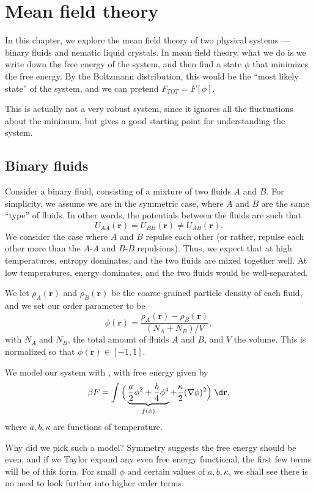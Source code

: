 \documentclass[a4paper]{article}
\begin{document}
\section{Mean field theory}
In this chapter, we explore the mean field theory of two physical systems --- binary fluids and nematic liquid crystals. In mean field theory, what we do is we write down the free energy of the system, and then find a state $\phi$ that minimizes the free energy. By the Boltzmann distribution, this would be the ``most likely state'' of the system, and we can pretend $F_{TOT} = F[\phi]$.

This is actually not a very robust system, since it ignores all the fluctuations about the minimum, but gives a good starting point for understanding the system.

\subsection{Binary fluids}
Consider a binary fluid, consisting of a mixture of two fluids $A$ and $B$. For simplicity, we assume we are in the symmetric case, where $A$ and $B$ are the same ``type'' of fluids. In other words, the potentials between the fluids are such that
\[
  U_{AA}(\mathbf{r}) = U_{BB}(\mathbf{r}) \not= U_{AB}(\mathbf{r}).
\]
We consider the case where $A$ and $B$ repulse each other (or rather, repulse each other more than the $A$-$A$ and $B$-$B$ repulsions). Thus, we expect that at high temperatures, entropy dominates, and the two fluids are mixed together well. At low temperatures, energy dominates, and the two fluids would be well-separated.

We let $\rho_A(\mathbf{r})$ and $\rho_B(\mathbf{r})$ be the coarse-grained particle density of each fluid, and we set our order parameter to be
\[
  \phi(\mathbf{r}) = \frac{\rho_A(\mathbf{r}) - \rho_B(\mathbf{r})}{(N_A + N_B)/V},
\]
with $N_A$ and $N_B$, the total amount of fluids $A$ and $B$, and $V$ the volume. This is normalized so that $\phi(\mathbf{r}) \in [-1, 1]$.

We model our system with , with free energy given by
\[
  \beta F = \int \Big(\underbrace{\frac{a}{2} \phi^2 + \frac{b}{4} \phi^4}_{f(\phi)} + \frac{\kappa}{2} (\nabla \phi)^2\Big)\;\d \mathbf{r},
\]
where $a, b, \kappa$ are functions of temperature.

Why did we pick such a model? Symmetry suggests the free energy should be even, and if we Taylor expand any even free energy functional, the first few terms will be of this form. For small $\phi$ and certain values of $a, b, \kappa$, we shall see there is no need to look further into higher order terms.
\end{document}

